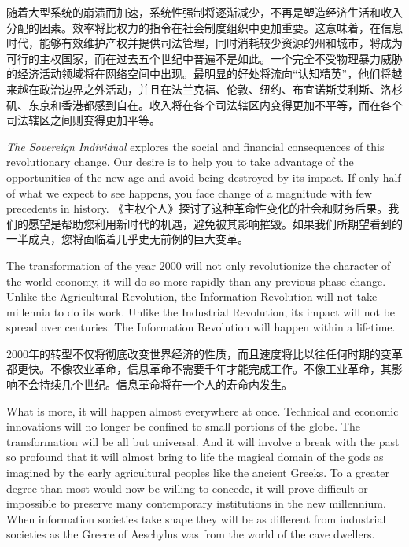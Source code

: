 \begin{Parallel}{97mm}{45mm}
  \ParallelRText
  {\small 随着大型系统的崩溃而加速，系统性强制将逐渐减少，不再是塑造经济生活和收入分配的因素。效率将比权力的指令在社会制度组织中更加重要。这意味着，在信息时代，能够有效维护产权并提供司法管理，同时消耗较少资源的州和城市，将成为可行的主权国家，而在过去五个世纪中普遍不是如此。一个完全不受物理暴力威胁的经济活动领域将在网络空间中出现。最明显的好处将流向“认知精英”，他们将越来越在政治边界之外活动，并且在法兰克福、伦敦、纽约、布宜诺斯艾利斯、洛杉矶、东京和香港都感到自在。收入将在各个司法辖区内变得更加不平等，而在各个司法辖区之间则变得更加平等。}
  \ParallelPar 

  \ParallelLText
  {\emph{The Sovereign Individual} explores the social and financial consequences of this revolutionary change. Our desire is to help you to take advantage of the opportunities of the new age and avoid being destroyed by its impact. If only half of what we expect to see happens, you face change of a magnitude with few precedents in history. }
  \ParallelRText
  {\small 《主权个人》探讨了这种革命性变化的社会和财务后果。我们的愿望是帮助您利用新时代的机遇，避免被其影响摧毁。如果我们所期望看到的一半成真，您将面临着几乎史无前例的巨大变革。}

  \ParallelPar  

  \ParallelLText
  {The transformation of the year 2000 will not only revolutionize the character of the world economy, it will do so more rapidly than any previous phase change. Unlike the Agricultural Revolution, the Information Revolution will not take millennia to do its work. Unlike the Industrial Revolution, its impact will not be spread over centuries. The Information Revolution will happen within a lifetime.  }
  
  \ParallelRText
  {\small 2000年的转型不仅将彻底改变世界经济的性质，而且速度将比以往任何时期的变革都更快。不像农业革命，信息革命不需要千年才能完成工作。不像工业革命，其影响不会持续几个世纪。信息革命将在一个人的寿命内发生。 }

  \ParallelPar  

  \ParallelLText
  {What is more, it will happen almost everywhere at once. Technical and economic innovations will no longer be confined to small portions of the globe. The transformation will be all but universal. And it will involve a break with the past so profound that it will almost bring to life the magical domain of the gods as imagined by the early agricultural peoples like the ancient Greeks. To a greater degree than most would now be willing to concede, it will prove difficult or impossible to preserve many contemporary institutions in the new millennium. When information societies take shape they will be as different from industrial societies as the Greece of Aeschylus was from the world of the cave dwellers. } 


\end{Parallel}
